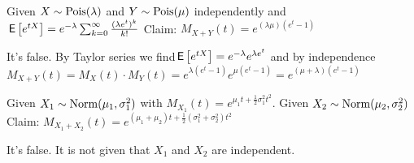 \documentclass[tf-tutorial-all.tex]{subfiles}
\begin{document}
\begin{truefalse}
Given  $X\sim \mathrm{Pois}(\lambda)$ and $Y \sim \mathrm{Pois}(\mu)$ independently and  $\,\mathsf{E}\left[e^{tX}\right] = e^{-\lambda}\sum^{\infty}_{k=0} \frac{(\lambda e^t)^k}{k!}$
Claim: $M_{X+Y}(t) = e^{(\lambda \mu)(e^t-1)}$
\begin{solution}
It's false. By Taylor series we find$ \,\mathsf{E}\left[e^{tX}\right] = e^{-\lambda} e^{\lambda e^t}$ and by independence $M_{X+Y}(t) = M_X(t) \cdot M_Y(t) = e^{\lambda(e^t-1)} e^{\mu(e^t-1)} = e^{(\mu + \lambda)(e^t-1)}$
\end{solution}
\end{truefalse}


\begin{truefalse}
Given $X_1\sim \mathrm{Norm}(\mu_1, \sigma_1^2)$ with $M_{X_1}(t) = e^{\mu_1t + \frac{1}{2}\sigma_1^2t^2}$.
Given  $X_2\sim \mathrm{Norm}(\mu_2, \sigma_2^2)$
Claim: $M_{X_1+X_2}(t) = e^{(\mu_1 + \mu_2)t +\frac{1}{2}(\sigma_1^2 + \sigma_2^2)t^2}$
\begin{solution}
It's false. It is not given that $X_1$ and $X_2$ are independent.
\end{solution}
\end{truefalse}
\end{document}
